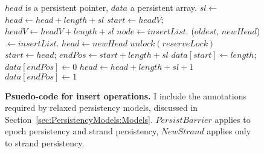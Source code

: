 \begin{figure}

  \caption{\textbf{Psuedo-code for insert operations.}  I include the annotations required by relaxed persistency models, discussed in Section~\ref{sec:PersistencyModels:Models}.  $PersistBarrier$ applies to epoch persistency and strand persistency, $NewStrand$ applies only to strand persistency.}
  \label{Alg::Queue}
  \begin{algorithmic}[1]
  \Require $head$ is a persistent pointer, $data$ a persistent array.
  \State $sl \gets$ 
    \State {}
    \State {}
    \State {}
    \State {}
    \State $head \gets head+length+sl$
    \State {}
  \EndFunction
  \State
    \State {}
    \State $start \gets headV;$ $headV \gets headV+length+sl$
    \State $node \gets insertList$.
    \State {}
    \State {}
    \State {}
    \State {}
    \State ($oldest$, $newHead$) $\gets insertList$.
    \State {}
      \State {}
      \State $head \gets newHead$
    \EndIf
    \State $unlock(reserveLock)$
  \EndFunction
  \State
    \State {}
    \State {}
    \State $start \gets head$; $endPos \gets start+length+sl$ %
    \State $data[start] \gets length$; $data[endPos] \gets 0$
    \State {}
    \State $head \gets head+length+sl+1$
    \State {}
    \State {}
    \State {}
    \State $data[endPos] \gets 1$
  \EndFunction
  \end{algorithmic}

\end{figure}

